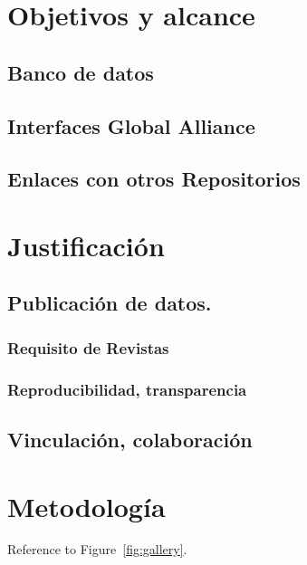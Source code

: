 \documentclass[
10pt, %
letterpaper, %
oneside, %
headinclude,footinclude, %
BCOR5mm, %
]{scrartcl}
\begin{document}
\section{Objetivos y alcance}


\subsection{Banco de datos}
\cite{_data_????}
\cite{altman_proposed_2007}
\cite{hrynaszkiewicz_call_2010}

\subsection{Interfaces Global Alliance}


\subsection{Enlaces con otros Repositorios}
\cite{_genebank_????}
\cite{king_introduction_2007}

\section{Justificación}


\subsection{Publicación de datos.}


\subsubsection{Requisito de Revistas}


\subsubsection{Reproducibilidad, transparencia}
\cite{ioannidis}

\subsection{Vinculación, colaboración}



\section{Metodología}
Reference to Figure~\vref{fig:gallery}. %
\end{document}

